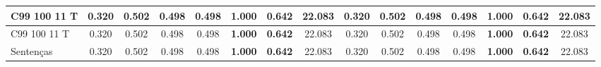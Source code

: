 \documentclass{article}
\begin{document}
\begin{longtable}[c]{|l|c|c|c|c|c|c|c||c|c|c|c|c|c|c|}
C99 100 11 T & 0.320 & 0.502 & 0.498 & 0.498 & \textbf{1.000} & \textbf{0.642} & 22.083 & 0.320 & 0.502 & 0.498 & 0.498 & \textbf{1.000} & \textbf{0.642} & 22.083\\ \hline
C99 100 11 T & 0.320 & 0.502 & 0.498 & 0.498 & \textbf{1.000} & \textbf{0.642} & 22.083 & 0.320 & 0.502 & 0.498 & 0.498 & \textbf{1.000} & \textbf{0.642} & 22.083\\ \hline
Sentenças & 0.320 & 0.502 & 0.498 & 0.498 & \textbf{1.000} & \textbf{0.642} & 22.083 & 0.320 & 0.502 & 0.498 & 0.498 & \textbf{1.000} & \textbf{0.642} & 22.083\\ \hline
\end{longtable} 
\end{document}
